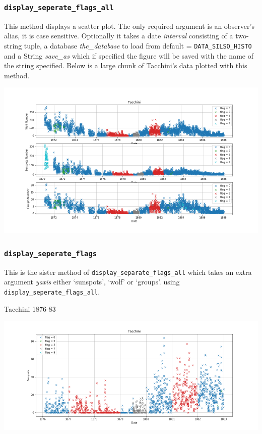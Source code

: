 \documentclass[12pt]{article}
\begin{document}
\subsubsection{\texttt{display\_seperate\_flags\_all}}
This method displays a scatter plot. The only required argument is an observer's alias, it is case sensitive. Optionally it takes a date \textit{interval} consisting of a two-string tuple, a database \textit{the\_database} to load from default = \texttt{DATA\_SILSO\_HISTO} and a String \textit{save\_as} which if specified the figure will be saved with the name of the string specified. Below is a large chunk of Tacchini's data plotted with this method.
{\centering
\includegraphics[width=\linewidth]{tacchini_pached.png}
\par}

\subsubsection{\texttt{display\_seperate\_flags}}
This is the sister method of \texttt{display\_separate\_flags\_all} which takes an extra argument \textit{yaxis} either `sunspots', `wolf' or `groups'.  using \texttt{display\_seperate\_flags\_all}.

{\centering
\caption{Tacchini 1876-83}
\includegraphics[width=\linewidth]{Tacchini_patches.png}
\par}
\end{document}
